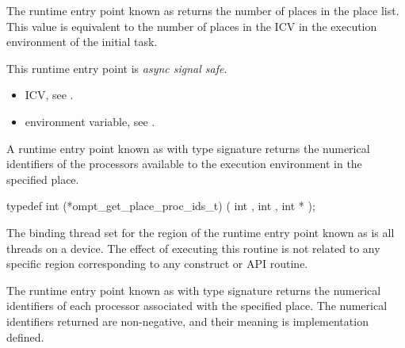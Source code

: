 \descr

The runtime entry point known as  
returns the number of places in the place list.
This value is equivalent to the number of places in
the   ICV in the execution environment
of the initial task.

This runtime entry point is \emph{async signal safe}.

\crossreferences
\begin{itemize}
\item {} ICV, see
.

\item {} environment variable, see
.
\end{itemize}




\label{sec:ompt_get_place_proc_ids_t}
\label{sec:ompt_get_place_proc_ids}

\summary

A runtime entry point known as
 with type signature
returns the numerical identifiers of the processors
available to the execution environment in the specified place.

\format

\begin{ccppspecific}
\begin{omptInquiry}
typedef int (*ompt_get_place_proc_ids_t) (
  int ,
  int ,
  int *
);
\end{omptInquiry}
\end{ccppspecific}


\binding

The binding thread set for the region
of the runtime entry point known as 
is all threads on a device. The effect of executing this
routine is not related to any specific region corresponding
to any construct or API routine.

\descr

The runtime entry point known as
 with type signature
 returns
the numerical identifiers of each processor
associated with the specified place.
The numerical identifiers returned are non-negative, and
their meaning is implementation defined.

\argdesc

